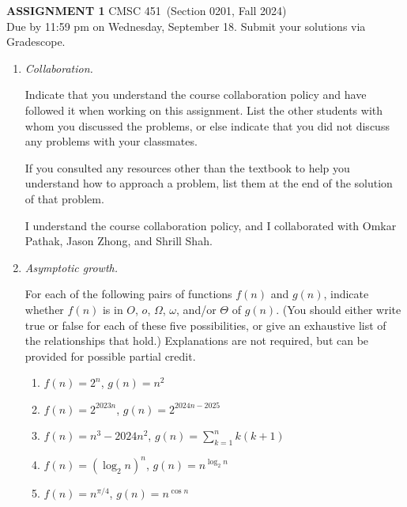 \documentclass[11pt]{article}
\newcommand{\term}{Section 0201, Fall 2024}
\newcommand{\course}{CMSC 451}
\newcommand{\anum}{1}
\newcommand{\duedate}{Wednesday, September 18}
\newcounter{totalpoints}
\newcommand{\points}[1]{\addtocounter{totalpoints}{#1}{[#1 point\ifthenelse{\equal{#1}{1}}{}{s}]}}
\begin{document}
{\large\textbf{ASSIGNMENT \anum} \hfill \course\ (\term)}
\smallskip\\
Due by 11:59 pm on \duedate. Submit your solutions via Gradescope.

\begin{enumerate}[leftmargin=*,start=0]


\item \emph{Collaboration.}

Indicate that you understand the course collaboration policy and have followed it when working on this assignment. List the other students with whom you discussed the problems, or else indicate that you did not discuss any problems with your classmates.

If you consulted any resources other than the textbook to help you understand how to approach a problem, list them at the end of the solution of that problem.

\hfill

I understand the course collaboration policy, and I collaborated with Omkar Pathak, Jason Zhong, and Shrill Shah.

\newpage

\item \emph{Asymptotic growth.} \points{20}

For each of the following pairs of functions $f(n)$ and $g(n)$, indicate whether $f(n)$ is in $O$, $o$, $\Omega$, $\omega$, and/or $\Theta$ of $g(n)$.  (You should either write true or false for each of these five possibilities, or give an exhaustive list of the relationships that hold.) Explanations are not required, but can be provided for possible partial credit.

\begin{enumerate}
  \item $f(n)=2^n$, $g(n)=n^2$

  \item $f(n)=2^{2023 n}$, $g(n)=2^{2024n - 2025}$

  \item $f(n)=n^3 - 2024 n^2$, $g(n)=\sum_{k=1}^n k(k+1)$

  \item $f(n)=(\log_2 n)^{n}$, $g(n)=n^{\log_2 n}$
 
  \item $f(n) = n^{\pi/4}$, $g(n)=n^{\cos n}$
\end{enumerate}


\end{enumerate}
\end{document}
